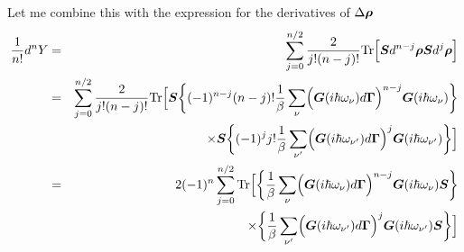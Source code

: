 \documentclass[11pt,a4paper]{report}
\begin{document}
Let me combine this with the expression for the derivatives of
$\Delta\bm{\rho}$
\begin{eqnarray}
\frac{1}{n!}d^nY
&=&\sum_{j=0}^{n/2} \frac{2}{j!(n-j)!}
\mathrm{Tr}\Bigl[\bm{S}d^{n-j}\bm{\rho}\bm{S}d^j\bm{\rho}\Bigr]
\nonumber\\
&=&\sum_{j=0}^{n/2} \frac{2}{j!(n-j)!}
\mathrm{Tr}\Bigl[\bm{S}
\biggl\lbrace
(-1)^{n-j}(n-j)!\frac{1}{\beta}\sum_\nu 
\Bigl(\bm{G}(i\hbar\omega_\nu)d\bm{\Gamma}\Bigr)^{n-j}\bm{G}(i\hbar\omega_\nu)
\biggr\rbrace
\nonumber\\
&&\times\bm{S}
\biggl\lbrace
(-1)^j j!\frac{1}{\beta}\sum_{\nu'} 
\Bigl(\bm{G}(i\hbar\omega_{\nu'})d\bm{\Gamma}\Bigr)^j\bm{G}(i\hbar\omega_{\nu'})
\biggr\rbrace
\Bigr]
\nonumber\\
&=&2(-1)^n\sum_{j=0}^{n/2} 
\mathrm{Tr}\Bigl[
\biggl\lbrace
\frac{1}{\beta}\sum_\nu 
\Bigl(\bm{G}(i\hbar\omega_\nu)d\bm{\Gamma}\Bigr)^{n-j}
\bm{G}(i\hbar\omega_\nu)\bm{S}
\biggr\rbrace
\nonumber\\
&&\times
\biggl\lbrace
\frac{1}{\beta}\sum_{\nu'} 
\Bigl(\bm{G}(i\hbar\omega_{\nu'})d\bm{\Gamma}\Bigr)^j
\bm{G}(i\hbar\omega_{\nu'})\bm{S}
\biggr\rbrace
\Bigr]
\nonumber\\
\end{eqnarray}
\end{document}
